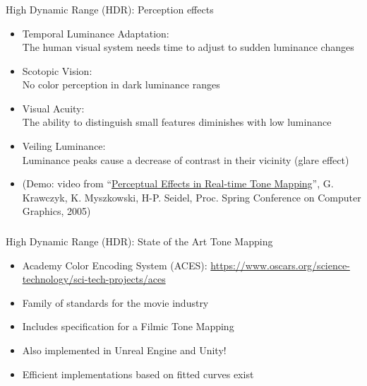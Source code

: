 \documentclass[utf8,stillsansserifmath,fleqn,t]{beamer}
\begin{document}
\begin{frame}
\frametitle{\insertsection}
High Dynamic Range (HDR): Perception effects
\begin{itemize}
\item Temporal Luminance Adaptation:\\
    The human visual system needs time to adjust to sudden luminance changes
\item Scotopic Vision:\\
    No color perception in dark luminance ranges
\item Visual Acuity:\\
    The ability to distinguish small features diminishes with low luminance
\item Veiling Luminance:\\
    Luminance peaks cause a decrease of contrast in their vicinity (glare effect)
\item (Demo: video from ``\href{https://resources.mpi-inf.mpg.de/hdr/peffects/}%
{Perceptual Effects in Real-time Tone Mapping}'', G. Krawczyk, K. Myszkowski, H-P. Seidel,
Proc. Spring Conference on Computer Graphics, 2005)
\end{itemize}
\end{frame}

\begin{frame}
\frametitle{\insertsection}
High Dynamic Range (HDR): State of the Art Tone Mapping
\begin{itemize}
\item Academy Color Encoding System (ACES):
\url{https://www.oscars.org/science-technology/sci-tech-projects/aces}
\item Family of standards for the movie industry
\item Includes specification for a Filmic Tone Mapping
\item Also implemented in Unreal Engine and Unity!
\item Efficient implementations based on fitted curves exist
\end{itemize}
\end{frame}
\end{document}
